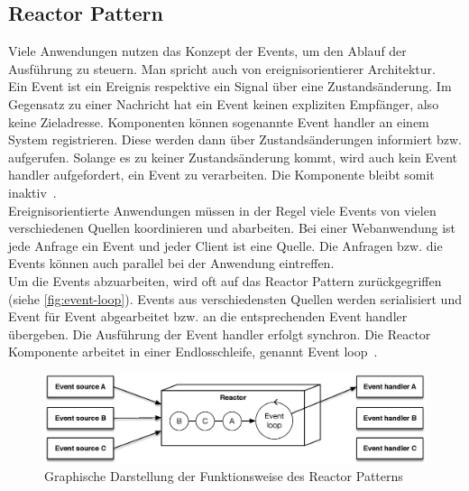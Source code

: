 \subsection{Reactor Pattern}
Viele Anwendungen nutzen das Konzept der Events, um den Ablauf der Ausführung zu steuern. Man spricht auch von ereignisorientierer Architektur.\\ 
Ein Event ist ein Ereignis respektive ein Signal über eine Zustandsänderung. Im Gegensatz zu einer Nachricht hat ein Event keinen expliziten Empfänger, also keine Zieladresse. Komponenten können sogenannte Event handler an einem System registrieren. Diese werden dann über Zustandsänderungen informiert bzw. aufgerufen. Solange es zu keiner Zustandsänderung kommt, wird auch kein Event handler aufgefordert, ein Event zu verarbeiten. Die Komponente bleibt somit inaktiv~\cite[S.~91]{erb_concurrent_2012}.\\
Ereignisorientierte Anwendungen müssen in der Regel viele Events von vielen verschiedenen Quellen koordinieren und abarbeiten. Bei einer Webanwendung ist jede Anfrage ein Event und jeder Client ist eine Quelle. Die Anfragen bzw. die Events können auch parallel bei der Anwendung eintreffen.\\
Um die Events abzuarbeiten, wird oft auf das Reactor Pattern zurückgegriffen (siehe \autoref{fig:event-loop}). Events aus verschiedensten Quellen werden serialisiert und Event für Event abgearbeitet bzw. an die entsprechenden Event handler übergeben. Die Ausführung der Event handler erfolgt synchron. Die Reactor Komponente arbeitet in einer Endlosschleife, genannt Event loop~\cite[S.~260~-~S.~261]{buschmann_pattern_2011}.

\begin{figure}[H]
 \centering
 \includegraphics[width=1.0\textwidth]{4-Hauptteil/event-loop/event-loop.eps}
 \caption{Graphische Darstellung der Funktionsweise des Reactor Patterns}
 \label{fig:event-loop}
\end{figure}

